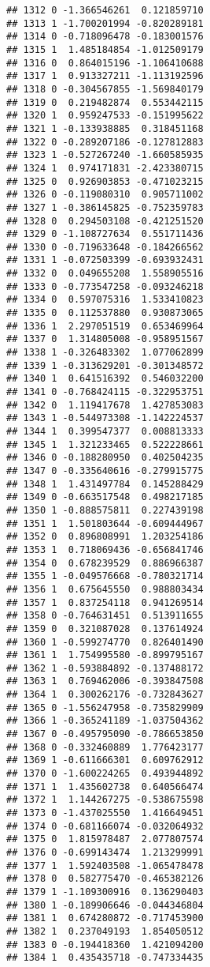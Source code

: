 \documentclass[
]{article}
\begin{document}
\begin{verbatim}
## 1312 0 -1.366546261  0.121859710
## 1313 1 -1.700201994 -0.820289181
## 1314 0 -0.718096478 -0.183001576
## 1315 1  1.485184854 -1.012509179
## 1316 0  0.864015196 -1.106410688
## 1317 1  0.913327211 -1.113192596
## 1318 0 -0.304567855 -1.569840179
## 1319 0  0.219482874  0.553442115
## 1320 1  0.959247533 -0.151995622
## 1321 1 -0.133938885  0.318451168
## 1322 0 -0.289207186 -0.127812883
## 1323 1 -0.527267240 -1.660585935
## 1324 1  0.974171831 -2.423380715
## 1325 0  0.926903853 -0.471023215
## 1326 0 -0.119080310  0.905711002
## 1327 1 -0.386145825 -0.752359783
## 1328 0  0.294503108 -0.421251520
## 1329 0 -1.108727634  0.551711436
## 1330 0 -0.719633648 -0.184266562
## 1331 1 -0.072503399 -0.693932431
## 1332 0  0.049655208  1.558905516
## 1333 0 -0.773547258 -0.093246218
## 1334 0  0.597075316  1.533410823
## 1335 0  0.112537880  0.930873065
## 1336 1  2.297051519  0.653469964
## 1337 0  1.314805008 -0.958951567
## 1338 1 -0.326483302  1.077062899
## 1339 1 -0.313629201 -0.301348572
## 1340 1  0.641516392  0.546032200
## 1341 0 -0.768424115 -0.322953751
## 1342 0  1.119417678  1.427853083
## 1343 1 -0.544973308 -1.142224537
## 1344 1  0.399547377  0.008813333
## 1345 1  1.321233465  0.522228661
## 1346 0 -0.188280950  0.402504235
## 1347 0 -0.335640616 -0.279915775
## 1348 1  1.431497784  0.145288429
## 1349 0 -0.663517548  0.498217185
## 1350 1 -0.888575811  0.227439198
## 1351 1  1.501803644 -0.609444967
## 1352 0  0.896808991  1.203254186
## 1353 1  0.718069436 -0.656841746
## 1354 0  0.678239529  0.886966387
## 1355 1 -0.049576668 -0.780321714
## 1356 1  0.675645550  0.988803434
## 1357 1  0.837254118  0.941269514
## 1358 0 -0.764631451  0.513911655
## 1359 0  0.321087028  0.137614924
## 1360 1 -0.599274770  0.826401490
## 1361 1  1.754995580 -0.899795167
## 1362 1 -0.593884892 -0.137488172
## 1363 1  0.769462006 -0.393847508
## 1364 1  0.300262176 -0.732843627
## 1365 0 -1.556247958 -0.735829909
## 1366 1 -0.365241189 -1.037504362
## 1367 0 -0.495795090 -0.786653850
## 1368 0 -0.332460889  1.776423177
## 1369 1 -0.611666301  0.609762912
## 1370 0 -1.600224265  0.493944892
## 1371 1  1.435602738  0.640566474
## 1372 1  1.144267275 -0.538675598
## 1373 0 -1.437025550  1.416649451
## 1374 0 -0.681166074 -0.032064932
## 1375 0  1.815978487  2.077807574
## 1376 0 -0.699143474  1.213299991
## 1377 1  1.592403508 -1.065478478
## 1378 0  0.582775470 -0.465382126
## 1379 1 -1.109300916  0.136290403
## 1380 1 -0.189906646 -0.044346804
## 1381 1  0.674280872 -0.717453900
## 1382 1  0.237049193  1.854050512
## 1383 0 -0.194418360  1.421094200
## 1384 1  0.435435718 -0.747334435

\end{verbatim}
\end{document}
